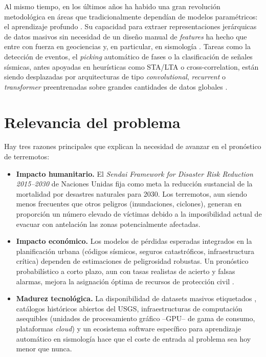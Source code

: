 Al mismo tiempo, en los últimos años ha habido una gran revolución metodológica en áreas que tradicionalmente dependían de modelos paramétricos: el aprendizaje profundo \citep{lecun2015deep, goodfellow2016deep}. Su capacidad para extraer representaciones jerárquicas de datos masivos sin necesidad de un diseño manual de \textit{features} ha hecho que entre con fuerza en geociencias \citep{bergen2019sciencedata, reichstein2019deep} y, en particular, en sismología \citep{kong2019mlseismology, beroza2021dlreview, mousavi2023review}. Tareas como la detección de eventos, el \textit{picking} automático de fases o la clasificación de señales sísmicas, antes apoyadas en heurísticas como STA/LTA o cross-correlation, están siendo desplazadas por arquitecturas de tipo \textit{convolutional}, \textit{recurrent} o \textit{transformer} preentrenadas sobre grandes cantidades de datos globales \citep{zhu2018phasenet, mousavi2020eqtransformer, ross2018generalized, perol2018convnetquake}.

\section{Relevancia del problema}
\label{relevancia-problema}

Hay tres razones principales que explican la necesidad de avanzar en el pronóstico de terremotos:

\begin{itemize}
  \item \textbf{Impacto humanitario.} El \textit{Sendai Framework for Disaster Risk Reduction 2015--2030} de Naciones Unidas \citep{un2015sendai} fija como meta la reducción sustancial de la mortalidad por desastres naturales para 2030. Los terremotos, aun siendo menos frecuentes que otros peligros (inundaciones, ciclones), generan en proporción un número elevado de víctimas debido a la imposibilidad actual de evacuar con antelación las zonas potencialmente afectadas.

  \item \textbf{Impacto económico.} Los modelos de pérdidas esperadas integrados en la planificación urbana (códigos sísmicos, seguros catastróficos, infraestructura crítica) dependen de estimaciones de peligrosidad robustas. Un pronóstico probabilístico a corto plazo, aun con tasas realistas de acierto y falsas alarmas, mejora la asignación óptima de recursos de protección civil \citep{jordan2011oef, marzocchi2014oef}.

  \item \textbf{Madurez tecnológica.} La disponibilidad de datasets masivos etiquetados \citep{mousavi2019stead}, catálogos históricos abiertos del USGS, infraestructuras de computación asequibles (unidades de procesamiento gráfico --GPU-- de gama de consumo, plataformas \textit{cloud}) y un ecosistema software específico para aprendizaje automático en sismología \citep{woollam2022seisbench, paszke2019pytorch, fey2019pyg} hace que el coste de entrada al problema sea hoy menor que nunca.
\end{itemize}

